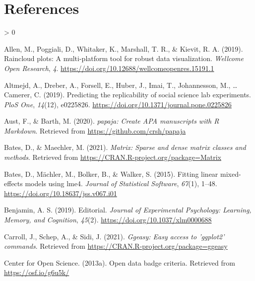 \documentclass[
  english,
  man,floatsintext]{apa6}
\newlength{\cslhangindent}
\newenvironment{CSLReferences}[2] %
 {%
  \setlength{\parindent}{0pt}
  \ifodd #1 \everypar{\setlength{\hangindent}{\cslhangindent}}\ignorespaces\fi
  \ifnum #2 > 0
  \setlength{\parskip}{#2\baselineskip}
  \fi
 }%
 {}
\begin{document}
\newpage

\hypertarget{references}{%
\section{References}\label{references}}

\begingroup
\setlength{\parindent}{-0.5in}
\setlength{\leftskip}{0.5in}

\hypertarget{refs}{}
\begin{CSLReferences}{1}{0}
\leavevmode\hypertarget{ref-allen2019raincloud}{}%
Allen, M., Poggiali, D., Whitaker, K., Marshall, T. R., \& Kievit, R. A. (2019). Raincloud plots: A multi-platform tool for robust data visualization. \emph{Wellcome Open Research}, \emph{4}. \url{https://doi.org/10.12688/wellcomeopenres.15191.1}

\leavevmode\hypertarget{ref-altmejd2019predicting}{}%
Altmejd, A., Dreber, A., Forsell, E., Huber, J., Imai, T., Johannesson, M., \ldots{} Camerer, C. (2019). Predicting the replicability of social science lab experiments. \emph{PloS One}, \emph{14}(12), e0225826. \url{https://doi.org/10.1371/journal.pone.0225826}

\leavevmode\hypertarget{ref-R-papaja}{}%
Aust, F., \& Barth, M. (2020). \emph{{papaja}: {Create} {APA} manuscripts with {R Markdown}}. Retrieved from \url{https://github.com/crsh/papaja}

\leavevmode\hypertarget{ref-R-Matrix}{}%
Bates, D., \& Maechler, M. (2021). \emph{Matrix: Sparse and dense matrix classes and methods}. Retrieved from \url{https://CRAN.R-project.org/package=Matrix}

\leavevmode\hypertarget{ref-R-lme4}{}%
Bates, D., Mächler, M., Bolker, B., \& Walker, S. (2015). Fitting linear mixed-effects models using {lme4}. \emph{Journal of Statistical Software}, \emph{67}(1), 1--48. \url{https://doi.org/10.18637/jss.v067.i01}

\leavevmode\hypertarget{ref-benjamin2019}{}%
Benjamin, A. S. (2019). Editorial. \emph{Journal of Experimental Psychology: Learning, Memory, and Cognition}, \emph{45}(2). \url{https://doi.org/10.1037/xlm0000688}

\leavevmode\hypertarget{ref-R-ggeasy}{}%
Carroll, J., Schep, A., \& Sidi, J. (2021). \emph{Ggeasy: Easy access to 'ggplot2' commands}. Retrieved from \url{https://CRAN.R-project.org/package=ggeasy}

\leavevmode\hypertarget{ref-center_2013a}{}%
Center for Open Science. (2013a). Open data badge criteria. Retrieved from \url{https://osf.io/g6u5k/}


\end{CSLReferences}
\end{document}
